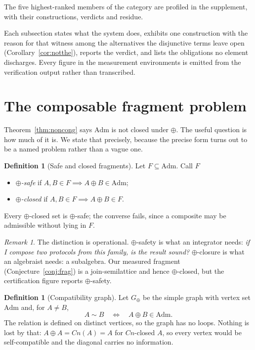 \documentclass[11pt,reqno]{amsart}
\theoremstyle{plain}
\theoremstyle{definition}
\newtheorem{definition}[theorem]{Definition}
\theoremstyle{remark}
\newtheorem{remark}[theorem]{Remark}
\newcommand{\Admf}{\mathrm{Adm}}
\begin{document}
The five highest-ranked members of the category are profiled in the
supplement, with their constructions, verdicts and residue.

Each
subsection states what the system does, exhibits one construction with the
reason for that witness among the alternatives the disjunctive terms leave open
(Corollary~\ref{cor:notthe}), reports the verdict, and lists the obligations no
element discharges. Every figure in the measurement environments is emitted from
the verification output rather than transcribed.

\section{The composable fragment problem}\label{sec:cfp}

Theorem~\ref{thm:noncong} says $\Admf$ is not closed under $\oplus$. The useful
question is how much of it is. We state that precisely, because the precise form
turns out to be a named problem rather than a vague one.

\begin{definition}[Safe and closed fragments]
Let $F \subseteq \Admf$. Call $F$
\begin{itemize}
  \item \emph{$\oplus$-safe} if $A, B \in F \implies A \oplus B \in \Admf$;
  \item \emph{$\oplus$-closed} if $A, B \in F \implies A \oplus B \in F$.
\end{itemize}
Every $\oplus$-closed set is $\oplus$-safe; the converse fails, since a composite
may be admissible without lying in $F$.
\end{definition}

\begin{remark}
The distinction is operational. $\oplus$-safety is what an integrator needs:
\emph{if I compose two protocols from this family, is the result sound?}
$\oplus$-closure is what an algebraist needs: a subalgebra. Our measured fragment
(Conjecture~\ref{conj:frag}) is a join-semilattice and hence $\oplus$-closed,
but the certification figure reports $\oplus$-safety.
\end{remark}

\begin{definition}[Compatibility graph]
Let $G_\oplus$ be the simple graph with vertex set $\Admf$ and, for
$A \neq B$,
\[
  A \sim B \quad\Longleftrightarrow\quad A \oplus B \in \Admf .
\]
The relation is defined on distinct vertices, so the graph has no loops. Nothing
is lost by that: $A \oplus A = Cn(A) = A$ for $Cn$-closed $A$, so every vertex
would be self-compatible and the diagonal carries no information.
\end{definition}
\end{document}
